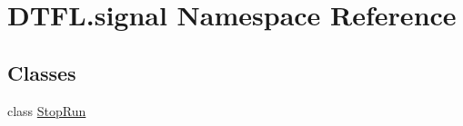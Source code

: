 \hypertarget{namespace_d_t_f_l_1_1signal}{}\section{D\+T\+F\+L.\+signal Namespace Reference}
\label{namespace_d_t_f_l_1_1signal}
\subsection*{Classes}
\begin{DoxyCompactItemize}
\item 
class \hyperlink{class_d_t_f_l_1_1signal_1_1_stop_run}{Stop\+Run}
\end{DoxyCompactItemize}
